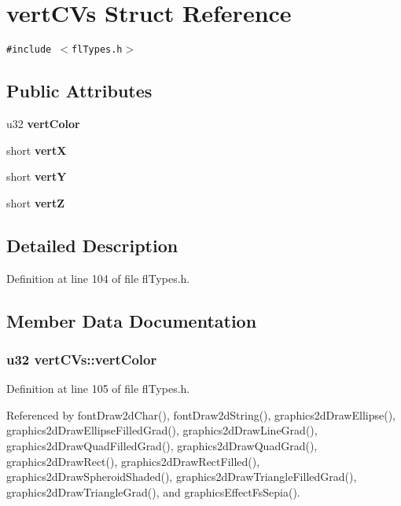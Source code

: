 \section{vert\-CVs Struct Reference}
\label{structvertCVs}
{\tt \#include $<$fl\-Types.h$>$}

\subsection*{Public Attributes}
\begin{CompactItemize}
\item 
u32 {\bf vert\-Color}
\item 
short {\bf vert\-X}
\item 
short {\bf vert\-Y}
\item 
short {\bf vert\-Z}
\end{CompactItemize}


\subsection{Detailed Description}




Definition at line 104 of file fl\-Types.h.

\subsection{Member Data Documentation}
\subsubsection{\setlength{\rightskip}{0pt plus 5cm}u32 {\bf vert\-CVs::vert\-Color}}\label{structvertCVs_8ebfc898c547e3313475fa5273889c13}




Definition at line 105 of file fl\-Types.h.

Referenced by font\-Draw2d\-Char(), font\-Draw2d\-String(), graphics2d\-Draw\-Ellipse(), graphics2d\-Draw\-Ellipse\-Filled\-Grad(), graphics2d\-Draw\-Line\-Grad(), graphics2d\-Draw\-Quad\-Filled\-Grad(), graphics2d\-Draw\-Quad\-Grad(), graphics2d\-Draw\-Rect(), graphics2d\-Draw\-Rect\-Filled(), graphics2d\-Draw\-Spheroid\-Shaded(), graphics2d\-Draw\-Triangle\-Filled\-Grad(), graphics2d\-Draw\-Triangle\-Grad(), and graphics\-Effect\-Fs\-Sepia().
